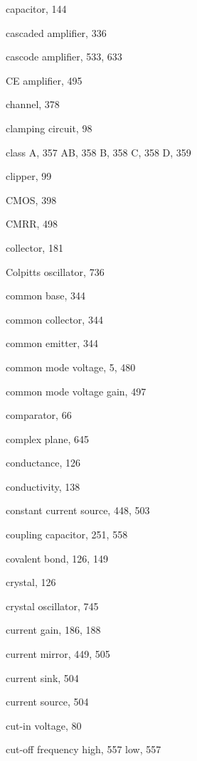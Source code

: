\begin{theindex}
\begin{otherlanguage}{english}
  \item capacitor, 144
  \item cascaded amplifier, 336
  \item cascode amplifier, 533, 633
  \item CE amplifier, 495
  \item channel, 378
  \item clamping circuit, 98
  \item class
    \subitem A, 357
    \subitem AB, 358
    \subitem B, 358
    \subitem C, 358
    \subitem D, 359
  \item clipper, 99
  \item CMOS, 398
  \item CMRR, 498
  \item collector, 181
  \item Colpitts oscillator, 736
  \item common base, 344
  \item common collector, 344
  \item common emitter, 344
  \item common mode voltage, 5, 480
  \item common mode voltage gain, 497
  \item comparator, 66
  \item complex plane, 645
  \item conductance, 126
  \item conductivity, 138
  \item constant current source, 448, 503
  \item coupling capacitor, 251, 558
  \item covalent bond, 126, 149
  \item crystal, 126
  \item crystal oscillator, 745
  \item current gain, 186, 188
  \item current mirror, 449, 505
  \item current sink, 504
  \item current source, 504
  \item cut-in voltage, 80
  \item cut-off frequency
    \subitem high, 557
    \subitem low, 557

  \indexspace


\end{otherlanguage}
\end{theindex}
